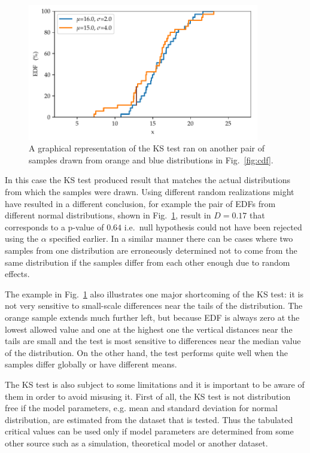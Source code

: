 \documentclass[english, twoside]{HYgradu}
\begin{document}
\begin{figure}
   \centering
   \includegraphics[width=0.9\textwidth]{kuvat/kstest-error.pdf}
   \caption{A graphical representation of the KS test ran on another pair of samples drawn from orange and blue distributions in Fig.\ \ref{fig:cdf}.}
   \label{fig:ks-error} 
\end{figure}

In this case the KS test produced result that matches the actual distributions from which the samples were drawn. Using different random realizations might have resulted in a different conclusion, for example the pair of EDFs from different normal distributions, shown in Fig.\ \ref{fig:ks-error}, result in $D=0.17$ that corresponds to a p-value of $0.64$ i.e.\ null hypothesis could not have been rejected using the $\alpha$ specified earlier. In a similar manner there can be cases where two samples from one distribution are erroneously determined not to come from the same distribution if the samples differ from each other enough due to random effects.

The example in Fig.~\ref{fig:ks-error} also illustrates one major shortcoming of the KS test: it is not very sensitive to small-scale differences near the tails of the distribution. The orange sample extends much further left, but because EDF is always zero at the lowest allowed value and one at the highest one the vertical distances near the tails are small and the test is most sensitive to differences near the median value of the distribution. On the other hand, the test performs quite well when the samples differ globally or have different means. \citep{feigelson2012modern}

The KS test is also subject to some limitations and it is important to be aware of them in order to avoid misusing it. First of all, the KS test is not distribution free if the model parameters, e.g. mean and standard deviation for normal distribution, are estimated from the dataset that is tested. Thus the tabulated critical values can be used only if model parameters are determined from some other source such as a simulation, theoretical model or another dataset.
\end{document}
